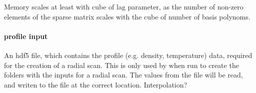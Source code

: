 Memory scales at least with cube of lag parameter, as the number of
non-zero elements of the sparse matrix scales with the cube of number of
basis polynoms.

\paragraph{profile input}
An hdf5 file, which contains the profile (e.g. density, temperature)
data, required for the creation of a radial scan.
This is only used by \neotwo when run to create the folders with the
inputs for a radial scan.
The values from the file will be read, and writen to the 
file at the correct location. Interpolation?
